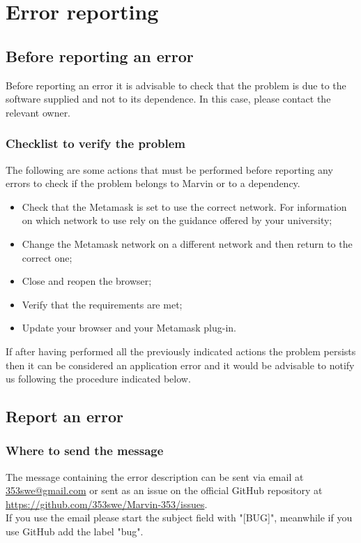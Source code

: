 \documentclass[ManualeUtente]{subfiles}
\begin{document}
\chapter{Error reporting}
\section{Before reporting an error}
Before reporting an error it is advisable to check that the problem is due to the software supplied and not to its dependence. In this case, please contact the relevant owner. \\

\subsection{Checklist to verify the problem}
The following are some actions that must be performed before reporting any errors to check if the problem belongs to Marvin or to a dependency.

\begin{itemize}
	\item Check that the Metamask is set to use the correct network. For information on which network to use rely on the guidance offered by your university;
	\item Change the Metamask network on a different network and then return to the correct one;
	\item Close and reopen the browser;
	\item Verify that the requirements are met;
	\item Update your browser and your Metamask plug-in.
\end{itemize}

If after having performed all the previously indicated actions the problem persists then it can be considered an application error and it would be advisable to notify us following the procedure indicated below.

\section{Report an error}
\subsection{Where to send the message}
The message containing the error description can be sent via email at \href{mailto: 353swe@gmail.com}{ 353swe@gmail.com} or sent as an issue on the official GitHub repository at \href{https://github.com/353swe/Marvin-353/issues}{https://github.com/353swe/Marvin-353/issues}. \\
If you use the email please start the subject field with "[BUG]", meanwhile if you use GitHub add the label "bug".
\end{document}
